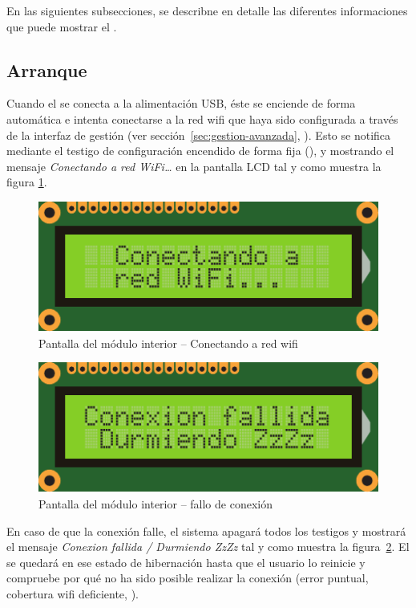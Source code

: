En las siguientes subsecciones, se describne en detalle las diferentes informaciones que puede mostrar el \CMS.

\subsection{Arranque}

Cuando el \MIE se conecta a la alimentación USB, éste se enciende de forma automática e intenta conectarse a la red wifi que haya sido configurada a través de la interfaz de gestión (ver sección~\ref{sec:gestion-avanzada}, \textit{}). Esto se notifica mediante el testigo de configuración  encendido de forma fija (), y mostrando el mensaje \emph{Conectando a red WiFi\ldots} en la pantalla LCD  tal y como muestra la figura \ref{fig:screen-conn-process}.

\begin{figure}[!b]
  \centering
  \includegraphics[width=0.6\columnwidth]{images/screen-conn-process}
  \caption{Pantalla del módulo interior -- Conectando a red wifi}
  \label{fig:screen-conn-process}
\end{figure}

\begin{figure}[!b]
  \centering
  \includegraphics[width=0.6\columnwidth]{images/screen-conn-failed}
  \caption{Pantalla del módulo interior -- fallo de conexión}
  \label{fig:screen-conn-failed}
\end{figure}


En caso de que la conexión falle, el sistema apagará todos los testigos y mostrará el mensaje \emph{Conexion fallida / Durmiendo ZzZz} tal y como muestra la figura~\ref{fig:screen-conn-failed}. El \MI se quedará en ese estado de hibernación hasta que el usuario lo reinicie y compruebe por qué no ha sido posible realizar la conexión (error puntual, cobertura wifi deficiente, \etc).



